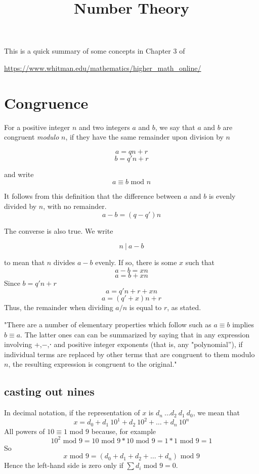 \documentclass[11pt, oneside]{article}
\title{Number Theory}
\date{}
\begin{document}
\maketitle
\Large

This is a quick summary of some concepts in Chapter 3 of 

\url{https://www.whitman.edu/mathematics/higher_math_online/}
\section*{Congruence}

For a positive integer $n$ and two integers $a$ and $b$, we say that $a$ and $b$ are congruent \emph{modulo} $n$, if they have the same remainder upon division by $n$

\[ a = qn + r \]
\[ b = q'n + r \]

and write
\[ a \equiv b \text{ mod } n \]

It follows from this definition that the difference between $a$ and $b$ is evenly divided by $n$, with no remainder.
\[ a - b = (q - q')n \]

The converse is also true.  We write

\[ n \ | \ a - b \]

to mean that $n$ divides $a - b$ evenly.  If so, there is some $x$ such that
\[ a - b = xn \]
\[ a = b + xn \]
Since $b = q'n + r$
\[ a = q'n + r + xn \]
\[ a = (q' + x)n + r \]
Thus, the remainder when dividing $a/n$ is equal to $r$, as stated.

"There are a number of elementary properties which follow such as $a \equiv b$ implies $b \equiv a$.  The latter ones can can be summarized by saying that in any expression involving +,−,⋅ and positive integer exponents (that is, any "polynomial''), if individual terms are replaced by other terms that are congruent to them modulo $n$, the resulting expression is congruent to the original."

\subsection*{casting out nines}
In decimal notation, if the representation of $x$ is $d_n \ \dots d_2 \ d_1 \ d_0$, we mean that
\[ x = d_0 + d_1 \ 10^1 + d_2 \ 10^2 + \dots + d_n \ 10^n \]
All powers of $10 \equiv 1$ mod $9$ because, for example
\[ 10^2 \text{ mod } 9 = 10 \text{ mod } 9 * 10 \text{ mod } 9 = 1 * 1 \text{ mod } 9 = 1 \]
So
\[ x \text{ mod } 9 = (d_0 + d_1 + d_2 + \dots + d_n)  \text{ mod } 9 \]
Hence the left-hand side is zero only if $\sum d_i \text{ mod } 9 = 0$.
\end{document}
